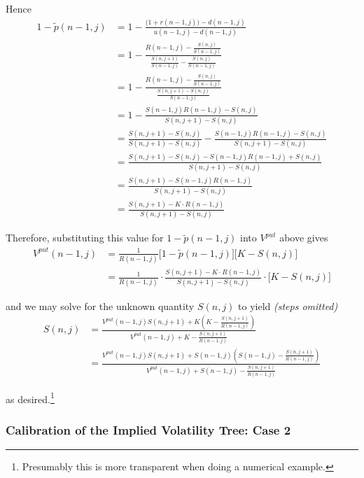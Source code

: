 \documentclass[12pt]{article}
\begin{document}
Hence
\begin{align*}
	1 - \tilde{p}(n - 1,j) &= 1 - \frac{ \big( 1 + r(n - 1,j)\big) - d(n - 1, j) }{ u(n - 1, j) - d(n - 1, j) } \\
	&= 1 - \frac{ R(n - 1, j) - \frac{ S(n, j) }{ S(n - 1, j) } }{ \frac{ S(n, j + 1) }{ S(n - 1, j) } - \frac{ S(n, j) }{ S(n - 1, j) } } \\
	&= 1 - \frac{ R(n - 1, j) - \frac{ S(n, j) }{ S(n - 1, j) } }{ \frac{ S(n, j + 1) - S(n, j) }{ S(n - 1, j) } } \\
	&= 1 - \frac{ S(n - 1,j)R(n - 1, j) - S(n, j) }{ S(n, j + 1) - S(n, j) } \\
	&= \frac{S(n, j + 1) - S(n, j)}{S(n, j + 1) - S(n, j)} - \frac{ S(n - 1,j)R(n - 1, j) - S(n, j) }{ S(n, j + 1) - S(n, j) } \\
	&= \frac{ S(n, j + 1) - S(n, j) - S(n - 1,j)R(n - 1, j) + S(n, j) }{ S(n, j + 1) - S(n, j) } \\
	&= \frac{ S(n, j + 1) - S(n - 1,j)R(n - 1, j) }{ S(n, j + 1) - S(n, j) } \\	
	&= \frac{ S(n, j + 1) - K \cdot R(n - 1, j) }{ S(n, j + 1) - S(n, j) } 
\end{align*}

Therefore, substituting this value for $1 - \tilde{p}(n - 1, j)$ into $V^{put}$ above gives
\begin{align*}
	V^{put}(n - 1,j) &= \frac{1}{R(n - 1, j)} \big[1 - \tilde{p}(n - 1, j)\big] \big[K - S(n,j) \big]  \\
	&= \frac{1}{R(n - 1, j)} \cdot \frac{ S(n, j + 1) - K \cdot R(n - 1, j) }{ S(n, j + 1) - S(n, j) } \cdot \big[K - S(n,j) \big] 
\end{align*}

and we may solve for the unknown quantity $S(n,j)$ to yield {\em (steps omitted)}
\begin{align*}
	S(n,j) &= \frac{ V^{put}(n - 1, j) S(n, j + 1) + K \left( K - \frac{ S(n, j + 1) }{ R(n - 1, j) } \right) }{ V^{put}(n - 1, j) + K - \frac{ S(n, j + 1) }{ R(n - 1, j) }} \\
	&= \frac{ V^{put}(n - 1, j) S(n, j + 1) + S(n - 1, j) \left( S(n - 1, j) - \frac{ S(n, j + 1) }{ R(n - 1, j) } \right) }{ V^{put}(n - 1, j) + S(n - 1, j) - \frac{ S(n, j + 1) }{ R(n - 1, j) }} 
\end{align*}

as desired.\footnote{Presumably this is more transparent when doing a numerical example.}

\subsubsection{Calibration of the Implied Volatility Tree: Case 2}
\end{document}
